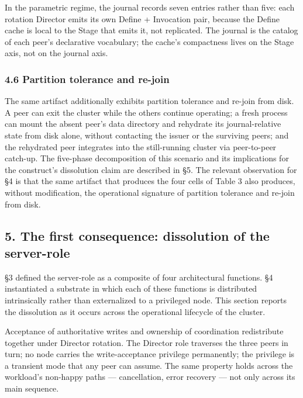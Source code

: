 \documentclass[
]{article}
\begin{document}
In the parametric regime, the journal records seven entries rather than
five: each rotation Director emits its own Define + Invocation pair,
because the Define cache is local to the Stage that emits it, not
replicated. The journal is the catalog of each peer's declarative
vocabulary; the cache's compactness lives on the Stage axis, not on the
journal axis.

\subsubsection{4.6 Partition tolerance and
re-join}\label{partition-tolerance-and-re-join}

The same artifact additionally exhibits partition tolerance and re-join
from disk. A peer can exit the cluster while the others continue
operating; a fresh process can mount the absent peer's data directory
and rehydrate its journal-relative state from disk alone, without
contacting the issuer or the surviving peers; and the rehydrated peer
integrates into the still-running cluster via peer-to-peer catch-up. The
five-phase decomposition of this scenario and its implications for the
construct's dissolution claim are described in §5. The relevant
observation for §4 is that the same artifact that produces the four
cells of Table 3 also produces, without modification, the operational
signature of partition tolerance and re-join from disk.

\subsection{5. The first consequence: dissolution of the
server-role}\label{the-first-consequence-dissolution-of-the-server-role}

§3 defined the server-role as a composite of four architectural
functions. §4 instantiated a substrate in which each of these functions
is distributed intrinsically rather than externalized to a privileged
node. This section reports the dissolution as it occurs across the
operational lifecycle of the cluster.

Acceptance of authoritative writes and ownership of coordination
redistribute together under Director rotation. The Director role
traverses the three peers in turn; no node carries the write-acceptance
privilege permanently; the privilege is a transient mode that any peer
can assume. The same property holds across the workload's non-happy
paths --- cancellation, error recovery --- not only across its main
sequence.
\end{document}
